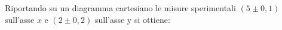 Riportando su un diagramma cartesiano 
le misure sperimentali $(5 \pm 0,1)$ sull'asse $x$ e $(2 \pm 0,2)$
sull'asse y si ottiene: